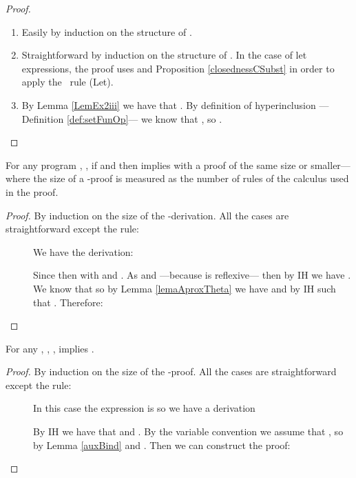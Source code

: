 \begin{proof}\label{DEMO_lemmashells}
\begin{enumerate}
  \item Easily by induction on the structure of .
  \item Straightforward by induction on the structure of . In the case of let expressions, the proof uses  and Proposition \ref{closednessCSubst} in order to apply the  \crwll ~rule (Let).
  \item By Lemma \ref{LemEx2iii} we have that . By definition of hyperinclusion ---Definition \ref{def:setFunOp}--- we know that , so .
\end{enumerate}
\end{proof}

For any program  , , if  and  then  implies  with a proof of the same size or smaller---where the size of a \crwll-proof is measured as the number of rules of the calculus used in the proof.

\begin{proof}\label{DEMO_propCrwlletPolar}
By induction on the size of the \crwl-derivation. All the cases are straightforward except the  rule:
\begin{description}
    \item[] We have the derivation:
     
     Since  then  with  and . As  and  ---because  is reflexive--- then by IH we have . We know that  so by Lemma \ref{lemaAproxTheta} we have  and by IH  such that . Therefore:
     
     \end{description}
\end{proof}

For any   , , ,  implies .

\begin{proof}\label{DEMO_closednessCSubst}
By induction on the size of the \crwll-proof. All the cases are straightforward except the  rule:
\begin{description}
    \item[] In this case the expression is  so we have a derivation
    
    By IH we have that  and . By the variable convention we assume that , so by Lemma \ref{auxBind}  and . Then we can construct the proof:
    
    \end{description}

\end{proof}

